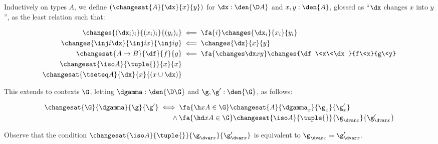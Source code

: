 
\begin{definition} \label{def:changes}
  Inductively on types $A$, we define $(\changesat{A}{\dx}{x}{y})$ for $\dx :
  \den{\D A}$ and $x,y : \den{A}$, glossed as ``$\dx$ changes $x$ into $y$'', as
  the least relation such that:

  \begin{align*}
    \changes{(\dx_i)_i}{(x_i)_i}{(y_i)_i}
    &\impliedby \fa{i} \changes{\dx_i}{x_i}{y_i}
    \\
    \changes{\inj i \dx}{\inj i x}{\inj i y}
    &\impliedby \changes{\dx}{x}{y}
    \\
    \changesat{A \to B}{\df}{f}{g}
    &\impliedby \fa{\changes\dx x y} \changes{\df\<x\<\dx}{f\<x}{g\<y}
    \\
    \changesat{\iso A}{\tuple{}}{x}{x}\\
    \changesat{\tseteq A}{\dx}{x}{(x \cup \dx)}
  \end{align*}

  \noindent This extends to contexts $\G$, letting $\dgamma : \den{\D\G}$ and
  $\g,\g' : \den{\G}$, as follows:

  \begin{align*}
    \changesat{\G}{\dgamma}{\g}{\g'}
    &\iff \fa{\h x A \in \G} \changesat{A}{\dgamma_x}{\g_x}{\g'_x}
    \\
    &\hspace*{1.8em}\wedge
    \fa{\hd x A \in \G}
    \changesat{\iso A}{\tuple{}}{\g_{\dvar x}}{\g'_{\dvar x}}
  \end{align*}

  \noindent Observe that the condition $\changesat{\iso A}{\tuple{}}{\g_{\dvar
      x}}{\g'_{\dvar x}}$ is equivalent to $\g_{\dvar x} = \g'_{\dvar x}$.

\end{definition}

